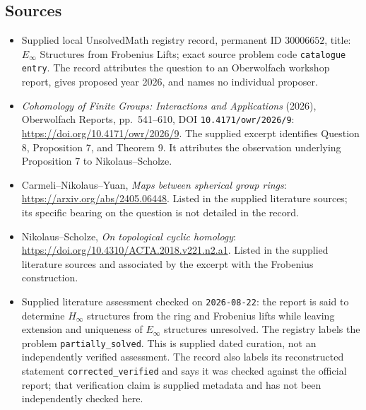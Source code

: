 \documentclass[11pt]{article}
\begin{document}
\subsection{Sources}
\begin{itemize}
\item Supplied local UnsolvedMath registry record, permanent ID \(30006652\), title: \(E_\infty\) Structures from Frobenius Lifts; exact source problem code \texttt{catalogue entry}. The record attributes the question to an Oberwolfach workshop report, gives proposed year 2026, and names no individual proposer.
\item \emph{Cohomology of Finite Groups: Interactions and Applications} (2026), Oberwolfach Reports, pp.\ 541--610, DOI \texttt{10.4171/owr/2026/9}: \url{https://doi.org/10.4171/owr/2026/9}. The supplied excerpt identifies Question 8, Proposition 7, and Theorem 9. It attributes the observation underlying Proposition 7 to Nikolaus--Scholze.
\item Carmeli--Nikolaus--Yuan, \emph{Maps between spherical group rings}: \url{https://arxiv.org/abs/2405.06448}. Listed in the supplied literature sources; its specific bearing on the question is not detailed in the record.
\item Nikolaus--Scholze, \emph{On topological cyclic homology}: \url{https://doi.org/10.4310/ACTA.2018.v221.n2.a1}. Listed in the supplied literature sources and associated by the excerpt with the Frobenius construction.
\item Supplied literature assessment checked on \texttt{2026-08-22}: the report is said to determine \(H_\infty\) structures from the ring and Frobenius lifts while leaving extension and uniqueness of \(E_\infty\) structures unresolved. The registry labels the problem \texttt{partially\_solved}. This is supplied dated curation, not an independently verified assessment. The record also labels its reconstructed statement \texttt{corrected\_verified} and says it was checked against the official report; that verification claim is supplied metadata and has not been independently checked here.
\end{itemize}
\end{document}
